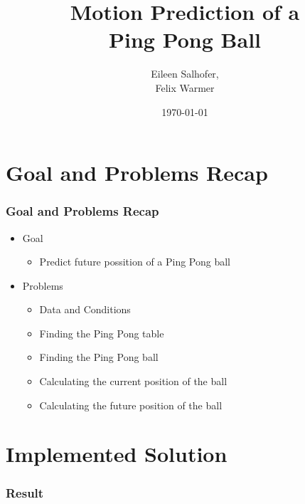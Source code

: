 \documentclass{beamer}
\title[Thema oder andere gleichbleibende Information]{ Motion Prediction of a \\Ping Pong Ball}
\author{Eileen Salhofer, \\Felix Warmer}
\date{\today}
\institute[]{}
\begin{document}
\titleframe



\section{Goal and Problems Recap}
\begin{frame}
	\frametitle{Goal and Problems Recap}
	\begin{itemize}
		\item Goal
		\begin{itemize}
			\item Predict future possition of a Ping Pong ball 
		\end{itemize}
		\item Problems
		\begin{itemize}
			\item Data and Conditions
			\item Finding the Ping Pong table
			\item Finding the Ping Pong ball
			\item Calculating the current position of the ball 
			\item Calculating the future position of the ball 
		\end{itemize}
	\end{itemize}
\end{frame}


\section{Implemented Solution}
\begin{frame}
	\frametitle{Result}
	\begin{center}
	
	\end{center}
\end{frame}
\end{document}
